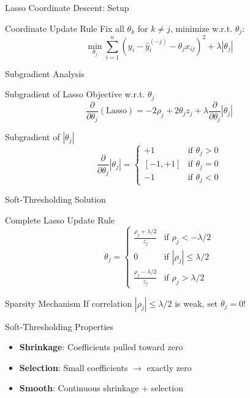 \documentclass{beamer}
\begin{document}
\begin{frame}{Lasso Coordinate Descent: Setup}
\begin{codebox}{Coordinate Update Rule}
Fix all $\theta_k$ for $k \neq j$, minimize w.r.t. $\theta_j$:
$$\min_{\theta_j} \sum_{i=1}^{n} (y_i - \hat{y}_i^{(-j)} - \theta_j x_{ij})^2 + \lambda |\theta_j|$$
\end{codebox}
\end{frame}

\begin{frame}{Subgradient Analysis}
\begin{codebox}{Subgradient of Lasso Objective w.r.t. $\theta_j$}
$$\frac{\partial}{\partial \theta_{j}}(\text{Lasso}) = -2\rho_{j} + 2\theta_{j}z_{j} + \lambda \frac{\partial}{\partial \theta_{j}}|\theta_{j}|$$
\end{codebox}
\pause

\begin{theorembox}{Subgradient of $|\theta_j|$}
$$\frac{\partial}{\partial \theta_{j}}|\theta_{j}| = \begin{cases}
+1 & \text{if } \theta_{j} > 0 \\
[-1,+1] & \text{if } \theta_{j} = 0 \\
-1 & \text{if } \theta_{j} < 0
\end{cases}$$
\end{theorembox}
\end{frame}

\begin{frame}{Soft-Thresholding Solution}
\footnotesize
\begin{theorembox}{Complete Lasso Update Rule}
$$\theta_{j} = \begin{cases}
\frac{\rho_{j} + \lambda/2}{z_{j}} & \text{if } \rho_{j} < -\lambda/2 \\
0 & \text{if } |\rho_{j}| \leq \lambda/2 \\
\frac{\rho_{j} - \lambda/2}{z_{j}} & \text{if } \rho_{j} > \lambda/2
\end{cases}$$
\end{theorembox}

\begin{alertbox}{Sparsity Mechanism}
If correlation $|\rho_j| \leq \lambda/2$ is weak, set $\theta_j = 0$!
\end{alertbox}

\begin{keypointsbox}{Soft-Thresholding Properties}
{\small
\begin{itemize}
\item \textbf{Shrinkage}: Coefficients pulled toward zero
\item \textbf{Selection}: Small coefficients $\rightarrow$ exactly zero
\item \textbf{Smooth}: Continuous shrinkage + selection
\end{itemize}
}
\end{keypointsbox}
\end{frame}
\end{document}
